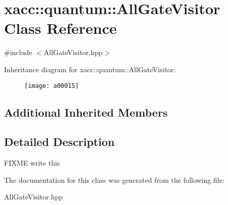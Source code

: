 \hypertarget{a00015}{}\section{xacc\+:\+:quantum\+:\+:All\+Gate\+Visitor Class Reference}
\label{a00015}


{\ttfamily \#include $<$All\+Gate\+Visitor.\+hpp$>$}

Inheritance diagram for xacc\+:\+:quantum\+:\+:All\+Gate\+Visitor\+:\begin{figure}[H]
\begin{center}
\leavevmode
\texttt{[image: a00015]}
\end{center}
\end{figure}
\subsection*{Additional Inherited Members}


\subsection{Detailed Description}
F\+I\+X\+ME write this 

The documentation for this class was generated from the following file\+:\begin{DoxyCompactItemize}
\item 
All\+Gate\+Visitor.\+hpp\end{DoxyCompactItemize}
